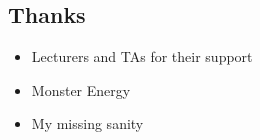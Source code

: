 \documentclass[twoside,twocolumn]{article}
\begin{document}
\subsection{Thanks}
\begin{itemize}
  \item Lecturers and TAs for their support
  \item Monster Energy\texttrademark
  \item My missing sanity
\end{itemize}



\end{document}
